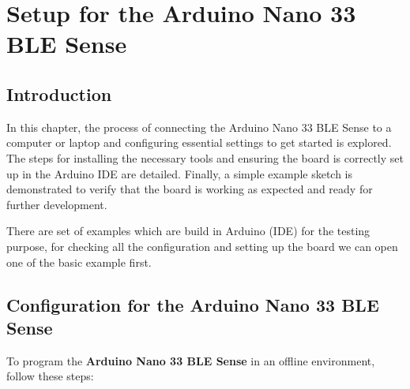 %
%
%



\chapter{Setup for the Arduino Nano 33 BLE Sense}

\section{Introduction}

In this chapter, the process of connecting the Arduino Nano 33 BLE Sense to a computer or laptop and configuring essential settings to get started is explored. The steps for installing the necessary tools and ensuring the board is correctly set up in the Arduino IDE are detailed. Finally, a simple example sketch is demonstrated to verify that the board is working as expected and ready for further development.

There are set of examples which are build in Arduino (IDE) for the testing purpose, for checking all the configuration and setting up the board we can open one of the basic example  first.




\section{Configuration for the Arduino Nano 33 BLE Sense}



To program the \textbf{Arduino Nano 33 BLE Sense} in an offline environment, follow these steps:

